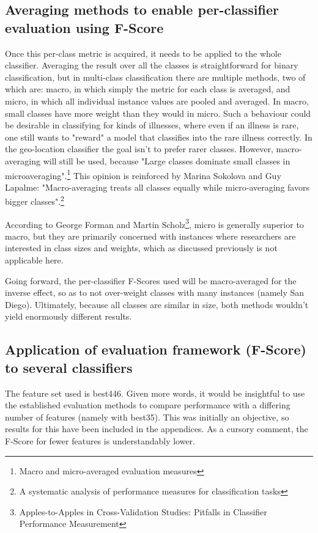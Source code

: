 \documentclass[twocolumn]{article}
\begin{document}
\subsection{Averaging methods to enable per-classifier evaluation using F-Score}
Once this per-class metric is acquired, it needs to be applied to the whole classifier. Averaging the result over all the classes is straightforward for binary classification, but in multi-class classification there are multiple methods, two of which are: macro, in which simply the metric for each class is averaged, and micro, in which all individual instance values are pooled and averaged. In macro, small classes have more weight than they would in micro. Such a behaviour could be desirable in classifying for kinds of illnesses, where even if an illness is rare, one still wants to "reward" a model that classifies into the rare illness correctly. In the geo-location classifier the goal isn't to prefer rarer classes. However, macro-averaging will still be used, because "Large classes dominate small classes in microaveraging".\footnote{\cite{vincentvanasch2013} Macro and micro-averaged evaluation measures} This opinion is reinforced by Marina Sokolova and Guy Lapalme: "Macro-averaging treats all classes equally while micro-averaging favors bigger classes".\footnote{\cite{sokolovam.lapalmeg.2009} A systematic analysis of performance measures for classification tasks}

According to George Forman and Martin Scholz\footnote{\cite{formang.scholzm2010} Apples-to-Apples in Cross-Validation Studies: Pitfalls in Classifier Performance Measurement}, micro is generally superior to macro, but they are primarily concerned with instances where researchers are interested in class sizes and weights, which as discussed previously is not applicable here.

Going forward, the per-classifier F-Scores used will be macro-averaged for the inverse effect, so as to not over-weight classes with many instances (namely San Diego). Ultimately, because all classes are similar in size, both methods wouldn't yield enormously different results.


\subsection{Application of evaluation framework (F-Score) to several classifiers}
The feature set used is best446. Given more words, it would be insightful to use the established evaluation methods to compare performance with a differing number of features (namely with best35). This was initially an objective, so results for this have been included in the appendices. As a cursory comment, the F-Score for fewer features is understandably lower. 
\end{document}
